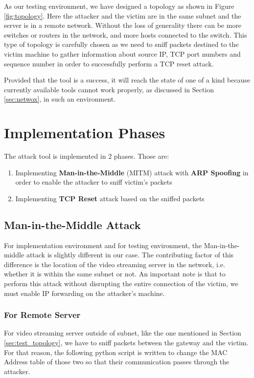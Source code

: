 \documentclass[14pt]{extarticle}
\begin{document}
     As our testing environment, we have designed a topology as shown in Figure \ref{fig:topology}. Here the attacker and the victim are in the same subnet and the server is in a remote network. Without the loss of generality there can be more switches or routers in the network, and more hosts connected to the switch. This type of topology is carefully chosen as we need to sniff packets destined to the victim machine to gather information about source IP, TCP port numbers and sequence number in order to successfully perform a TCP reset attack.
     
     
     Provided that the tool is a success, it will reach the state of one of a kind because currently available tools cannot work properly, as discussed in Section \ref{sec:netwox}, in such an environment.
    

\section{Implementation Phases}    
    The attack tool is implemented in 2 phases. Those are: 
    \begin{enumerate}
        \item Implementing \textbf{Man-in-the-Middle} (MITM) attack with \textbf{ARP Spoofing} in order to enable the attacker to sniff victim's packets
        \item Implementing \textbf{TCP Reset} attack based on the sniffed packets
    \end{enumerate}
    
    \subsection{Man-in-the-Middle Attack}
        For implementation environment and for testing environment, the Man-in-the-middle attack is slightly different in our case. The contributing factor of this difference is the location of the video streaming server in the network, i.e. whether it is within the same subnet or not. An important note is that to perform this attack without disrupting the entire connection of the victim, we must enable IP forwarding on the attacker's machine.
        
        \subsubsection{For Remote Server}
            For video streaming server outside of subnet, like the one mentioned in Section \ref{sec:test_topology}, we have to sniff packets between the gateway and the victim. For that reason, the following python script is written to change the MAC Address table of those two so that their communication passes through the attacker.
            
            
\end{document}
